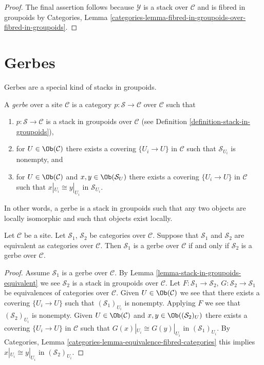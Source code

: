 \begin{proof}
\medskip\noindent
The final assertion follows because $\mathcal{Y}$ is a stack over
$\mathcal{C}$ and is fibred in groupoids by
Categories, Lemma
\ref{categories-lemma-fibred-in-groupoids-over-fibred-in-groupoids}.
\end{proof}





\section{Gerbes}
\label{section-gerbes}

\noindent
Gerbes are a special kind of stacks in groupoids.

\begin{definition}
\label{definition-gerbe}
A {\it gerbe} over a site $\mathcal{C}$ is a category
$p : \mathcal{S} \to \mathcal{C}$ over $\mathcal{C}$ such that
\begin{enumerate}
\item $p : \mathcal{S} \to \mathcal{C}$ is a stack
in groupoids over $\mathcal{C}$ (see
Definition \ref{definition-stack-in-groupoids}),
\item for $U \in \Ob(\mathcal{C})$ there exists
a covering $\{U_i \to U\}$ in $\mathcal{C}$ such that
$\mathcal{S}_{U_i}$ is nonempty, and
\item for $U \in \Ob(\mathcal{C})$ and
$x, y \in \Ob(\mathcal{S}_U)$ there exists
a covering $\{U_i \to U\}$ in $\mathcal{C}$ such that
$x|_{U_i} \cong y|_{U_i}$ in $\mathcal{S}_{U_i}$.
\end{enumerate}
\end{definition}

\noindent
In other words, a gerbe is a stack in groupoids such that any two objects
are locally isomorphic and such that objects exist locally.

\begin{lemma}
\label{lemma-gerbe-equivalent}
Let $\mathcal{C}$ be a site.
Let $\mathcal{S}_1$, $\mathcal{S}_2$ be categories over $\mathcal{C}$.
Suppose that $\mathcal{S}_1$ and $\mathcal{S}_2$ are equivalent
as categories over $\mathcal{C}$.
Then $\mathcal{S}_1$ is a gerbe over $\mathcal{C}$ if and only if
$\mathcal{S}_2$ is a gerbe over $\mathcal{C}$.
\end{lemma}

\begin{proof}
Assume $\mathcal{S}_1$ is a gerbe over $\mathcal{C}$. By
Lemma \ref{lemma-stack-in-groupoids-equivalent}
we see $\mathcal{S}_2$ is a stack in groupoids over $\mathcal{C}$.
Let $F : \mathcal{S}_1 \to \mathcal{S}_2$,
$G : \mathcal{S}_2 \to \mathcal{S}_1$ be equivalences of categories over
$\mathcal{C}$. Given $U \in \Ob(\mathcal{C})$ we see that there exists
a covering $\{U_i \to U\}$ such that $(\mathcal{S}_1)_{U_i}$ is
nonempty. Applying $F$ we see that $(\mathcal{S}_2)_{U_i}$ is nonempty.
Given $U \in \Ob(\mathcal{C})$ and
$x, y \in \Ob((\mathcal{S}_2)_U)$ there exists
a covering $\{U_i \to U\}$ in $\mathcal{C}$ such that
$G(x)|_{U_i} \cong G(y)|_{U_i}$ in $(\mathcal{S}_1)_{U_i}$. By
Categories, Lemma \ref{categories-lemma-equivalence-fibred-categories}
this implies $x|_{U_i} \cong y|_{U_i}$ in $(\mathcal{S}_2)_{U_i}$.
\end{proof}

